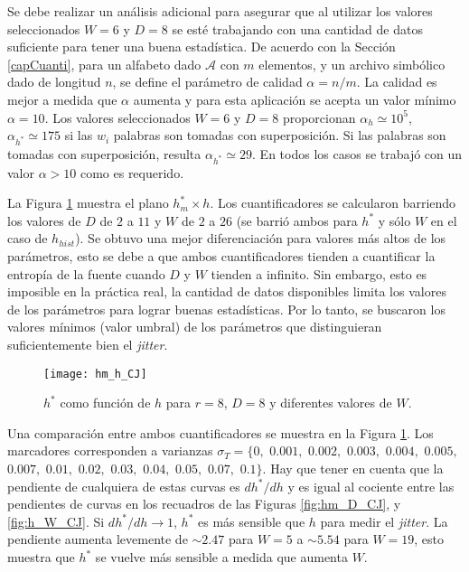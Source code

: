 Se debe realizar un análisis adicional para asegurar que al utilizar los valores seleccionados $W = 6$ y $D = 8$ se esté trabajando con una cantidad de datos suficiente para tener una buena estadística.
De acuerdo con la Sección \ref{capCuanti}, para un alfabeto dado $\mathcal{A}$ con $m$ elementos, y un archivo simbólico dado de longitud $n$, se define el parámetro de calidad $\alpha = n/m$.
La calidad es mejor a medida que $\alpha$ aumenta y para esta aplicación se acepta un valor mínimo $\alpha = 10$.
Los valores seleccionados $W = 6$ y $D = 8$ proporcionan $\alpha_h \simeq 10^5$, $ \alpha_ {h^*} \simeq 175$ si las $w_i$ palabras son tomadas con superposición.
Si las palabras son tomadas con superposición, resulta $ \alpha_ {h^*} \simeq 29$.
En todos los casos se trabajó con un valor $\alpha>10$ como es requerido.

La Figura \ref{fig:hm_h_CJ} muestra el plano $h^*_{m} \times h$.
Los cuantificadores se calcularon barriendo los valores de $D$ de $2$ a $11$ y $W$ de $2$ a $26$ (se barrió ambos para $h^*$ y sólo $W$ en el caso de $h_{hist}$).
Se obtuvo una mejor diferenciación para valores más altos de los parámetros, esto se debe a que ambos cuantificadores tienden a cuantificar la entropía de la fuente cuando $D$ y $W$ tienden a infinito.
Sin embargo, esto es imposible en la práctica real, la cantidad de datos disponibles limita los valores de los parámetros para lograr buenas estadísticas.
Por lo tanto, se buscaron los valores mínimos (valor umbral) de los parámetros que distinguieran suficientemente bien el \textit{jitter}.
%
\begin{figure}
	\centering
	\texttt{[image: hm\_h\_CJ]}
	\caption{$h^*$ como función de $h$ para $r=8$, $D=8$ y diferentes valores de $W$.}
	\label{fig:hm_h_CJ}
\end{figure}

Una comparación entre ambos cuantificadores se muestra en la Figura \ref{fig:hm_h_CJ}.
Los marcadores corresponden a varianzas $\sigma_T=\{0,$ $0.001,$ $0.002,$ $0.003,$ $0.004,$ $0.005,$ $0.007,$ $0.01,$ $0.02,$ $0.03,$ $0.04,$ $0.05,$ $0.07,$ $0.1\}$.
Hay que tener en cuenta que la pendiente de cualquiera de estas curvas es $dh^*/dh$ y es igual al cociente entre las pendientes de curvas en los recuadros de las Figuras \ref{fig:hm_D_CJ}, y \ref{fig:h_W_CJ}.
Si $dh^*/dh\to1$, $h^*$ es más sensible que $h$ para medir el \textit{jitter}.
La pendiente aumenta levemente de $\sim2.47$ para $W =5 $ a $\sim5.54$ para $W = 19$, esto muestra que $h^*$ se vuelve más sensible a medida que aumenta $W$.

